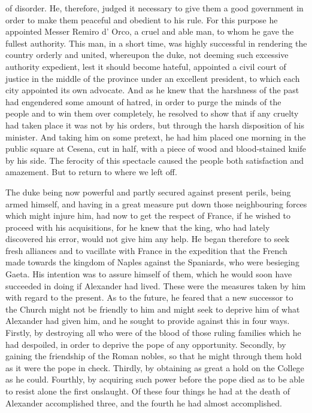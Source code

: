 \documentclass[12pt,letterpaper]{memoir}
\begin{document}
of disorder. He, therefore, judged it necessary to give them a good
government in order to make them peaceful and obedient to his rule.
For this purpose he appointed Messer Remiro d' Orco, a cruel and able
man, to whom he gave the fullest authority. This man, in a short time,
was highly successful in rendering the country orderly and united,
whereupon the duke, not deeming such excessive authority expedient,
lest it should become hateful, appointed a civil court of justice in
the middle of the province under an excellent president, to which each
city appointed its own advocate. And as he knew that the harshness of
the past had engendered some amount of hatred, in order to purge the
minds of the people and to win them over completely, he resolved to
show that if any cruelty had taken place it was not by his orders, but
through the harsh disposition of his minister. And taking him on some
pretext, he had him placed one morning in the public square at Cesena,
cut in half, with a piece of wood and blood-stained knife by his side.
The ferocity of this spectacle caused the people both satisfaction and
amazement. But to return to where we left off.

The duke being now powerful and partly secured against present perils,
being armed himself, and having in a great measure put down those
neighbouring forces which might injure him, had now to get the respect
of France, if he wished to proceed with his acquisitions, for he
knew that the king, who had lately discovered his error, would not
give him any help. He began therefore to seek fresh alliances and to
vacillate with France in the expedition that the French made towards
the kingdom of Naples against the Spaniards, who were besieging Gaeta.
His intention was to assure himself of them, which he would soon have
succeeded in doing if Alexander had lived. These were the measures
taken by him with regard to the present. As to the future, he feared
that a new successor to the Church might not be friendly to him and
might seek to deprive him of what Alexander had given him, and he
sought to provide against this in four ways. Firstly, by destroying all
who were of the blood of those ruling families which he had despoiled,
in order to deprive the pope of any opportunity. Secondly, by gaining
the friendship of the Roman nobles, so that he might through them hold
as it were the pope in check. Thirdly, by obtaining as great a hold on
the College as he could. Fourthly, by acquiring such power before the
pope died as to be able to resist alone the first onslaught. Of these
four things he had at the death of Alexander accomplished three, and
the fourth he had almost accomplished.
\end{document}
